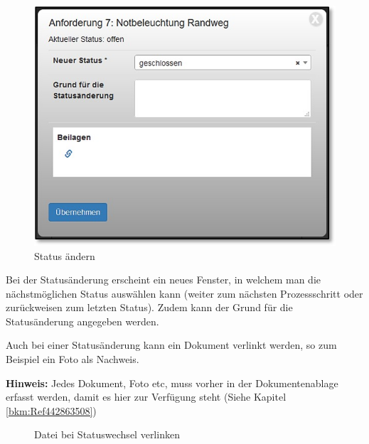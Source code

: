 \begin{figure}   %
  \vspace{-30pt}      %
  \begin{center}
    \includegraphics[width=1\linewidth]{../chapters/06_Anf-Maengelmanagement/pictures/amm_AnfStatusAendern.jpg}
  \end{center}
  \vspace{-20pt}
  \caption{Status ändern}
  \vspace{-10pt}
\end{figure}
Bei der Statusänderung erscheint ein neues Fenster, in welchem man die nächstmöglichen Status auswählen kann (weiter zum nächsten Prozessschritt oder zurückweisen zum letzten Status). Zudem kann der Grund für die Statusänderung angegeben werden.

\vspace{.3cm} 

Auch bei einer Statusänderung kann ein Dokument verlinkt  werden, so zum Beispiel ein Foto als Nachweis.

\vspace{\baselineskip}

\textbf{Hinweis:} Jedes Dokument, Foto etc, muss vorher in der Dokumentenablage erfasst werden, damit es hier zur Verfügung steht (Siehe Kapitel \ref{bkm:Ref442863508})

\begin{figure}[H]
\caption{Datei bei Statuswechsel verlinken}
\end{figure}

